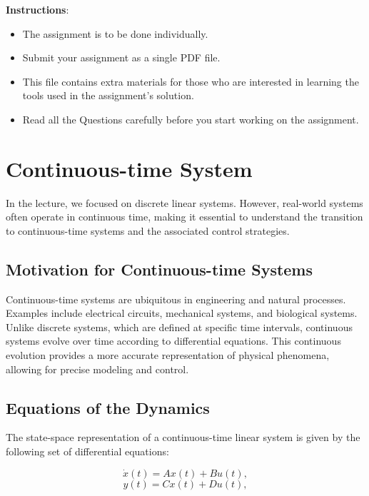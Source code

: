 \documentclass[a4 paper]{article}
\begin{document}
\textbf{Instructions}: 
\begin{itemize}
    \item The assignment is to be done individually.
    \item Submit your assignment as a single PDF file.
    \item This file contains extra materials for those who are interested in learning the tools used in the assignment's solution.
    \item Read all the Questions carefully before you start working on the assignment.
\end{itemize}


\section{Continuous-time System}

In the lecture, we focused on discrete linear systems. However, real-world systems often operate in continuous time, 
making it essential to understand the transition to continuous-time systems and the associated control strategies.

\subsection{Motivation for Continuous-time Systems}
Continuous-time systems are ubiquitous in engineering and natural processes. Examples include electrical circuits, 
mechanical systems, and biological systems. Unlike discrete systems, which are defined at specific time intervals, 
continuous systems evolve over time according to differential equations. This continuous evolution provides a more 
accurate representation of physical phenomena, allowing for precise modeling and control.

\subsection{Equations of the Dynamics}
The state-space representation of a continuous-time linear system is given by the following set of differential equations:

\begin{equation}
    \dot{x}(t) = A x(t) + B u(t),
\end{equation}
\begin{equation}
    y(t) = C x(t) + D u(t),
\end{equation}
\end{document}
